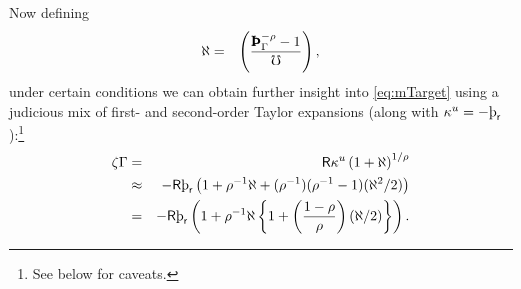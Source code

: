 \documentclass{handout}
\begin{document}
Now defining
\begin{eqnarray}
  \aleph & = & \left(\frac{\PatPGro^{-\CRRA} - 1}{\urate}\right),
\end{eqnarray}
under certain conditions we can obtain further insight into \eqref{eq:mTarget} using a judicious mix of first- and second-order Taylor expansions (along with $\MPCU = -\patr$):\footnote{See below for caveats.}
\begin{eqnarray}
  \label{eq:zetaExp}
  \zeta\PGro & = & \Rfree \MPCU \left(1+\aleph\right)^{1/\CRRA}
\\ & \approx & -\Rfree \patr \left(1+\CRRA^{-1}\aleph+(\CRRA^{-1})(\CRRA^{-1}-1)(\aleph^{2}/2)\right)
\\ & = & -\Rfree \patr \left(1+\CRRA^{-1}\aleph\left\{1+\left(\frac{1-\CRRA}{\CRRA}\right)(\aleph/2)\right\}\right) \label{eq:zetaTaylor2}
.
\end{eqnarray}
\end{document}
